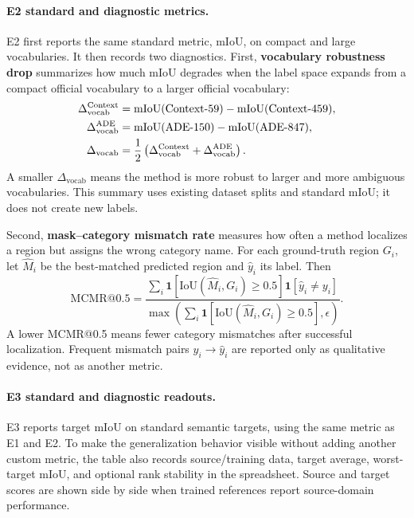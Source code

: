 \documentclass[11pt,a4paper]{article}
\begin{document}
\paragraph{E2 standard and diagnostic metrics.}
E2 first reports the same standard metric, mIoU, on compact and large vocabularies. It then records two diagnostics.
First, \textbf{vocabulary robustness drop} summarizes how much mIoU degrades when the label space expands from a compact official vocabulary to a larger official vocabulary:
\begin{align}
\Delta_{\mathrm{vocab}}^{\mathrm{Context}} &= \mathrm{mIoU}(\mathrm{Context}{\text -}59)-\mathrm{mIoU}(\mathrm{Context}{\text -}459),\\
\Delta_{\mathrm{vocab}}^{\mathrm{ADE}} &= \mathrm{mIoU}(\mathrm{ADE}{\text -}150)-\mathrm{mIoU}(\mathrm{ADE}{\text -}847),\\
\Delta_{\mathrm{vocab}} &= \frac{1}{2}\left(\Delta_{\mathrm{vocab}}^{\mathrm{Context}}+\Delta_{\mathrm{vocab}}^{\mathrm{ADE}}\right).
\end{align}
A smaller $\Delta_{\mathrm{vocab}}$ means the method is more robust to larger and more ambiguous vocabularies. This summary uses existing dataset splits and standard mIoU; it does not create new labels.

Second, \textbf{mask--category mismatch rate} measures how often a method localizes a region but assigns the wrong category name. For each ground-truth region $G_i$, let $\hat{M}_i$ be the best-matched predicted region and $\hat{y}_i$ its label. Then
\begin{equation}
\mathrm{MCMR@0.5}=
\frac{\sum_i \mathbf{1}[\mathrm{IoU}(\hat{M}_i,G_i)\ge 0.5] \mathbf{1}[\hat{y}_i\ne y_i]}
{\max\left(\sum_i \mathbf{1}[\mathrm{IoU}(\hat{M}_i,G_i)\ge 0.5],\epsilon\right)}.
\end{equation}
A lower MCMR@0.5 means fewer category mismatches after successful localization. Frequent mismatch pairs $y_i\rightarrow\hat{y}_i$ are reported only as qualitative evidence, not as another metric.

\paragraph{E3 standard and diagnostic readouts.}
E3 reports target mIoU on standard semantic targets, using the same metric as E1 and E2. To make the generalization behavior visible without adding another custom metric, the table also records source/training data, target average, worst-target mIoU, and optional rank stability in the spreadsheet. Source and target scores are shown side by side when trained references report source-domain performance.
\end{document}
